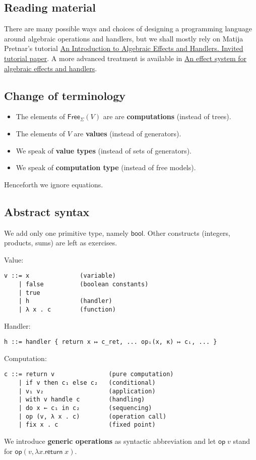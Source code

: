 \documentclass{article}
\begin{document}
\subsection{Reading material}

There are many possible ways and choices of designing a programming language
around algebraic operations and handlers, but we shall mostly rely on Matija
Pretnar's tutorial \href{http://www.eff-lang.org/handlers-tutorial.pdf}{An
  Introduction to Algebraic Effects and Handlers. Invited tutorial paper}. A
more advanced treatment is available in
\href{https://arxiv.org/abs/1306.6316}{An effect system for algebraic effects
  and handlers}.

\subsection{Change of terminology}

\begin{itemize}
\item The elements of $\mathsf{Free}_\Sigma(V)$ are  are \textbf{computations} (instead of trees).
\item The elements of $V$ are \textbf{values} (instead of generators).
\item We speak of \textbf{value types} (instead of sets of generators).
\item We speak of \textbf{computation type} (instead of free models).
\end{itemize}

Henceforth we ignore equations.

\subsection{Abstract syntax}

We add only one primitive type, namely $\mathsf{bool}$. Other constructs
(integers, products, sums) are left as exercises.

\noindent
Value:
%
\begin{lstlisting}
v ::= x              (variable)
    | false          (boolean constants)
    | true
    | h              (handler)
    | λ x . c        (function)
\end{lstlisting}
%
Handler:
%
\begin{lstlisting}
h ::= handler { return x ↦ c_ret, ... opᵢ(x, κ) ↦ cᵢ, ... }
\end{lstlisting}
%
Computation:
%
\begin{lstlisting}
c ::= return v               (pure computation)
    | if v then c₁ else c₂   (conditional)
    | v₁ v₂                  (application)
    | with v handle c        (handling)
    | do x ← c₁ in c₂        (sequencing)
    | op (v, λ x . c)        (operation call)
    | fix x . c              (fixed point)
\end{lstlisting}
%
We introduce \textbf{generic operations} as syntactic abbreviation and let
$\mathsf{op}\;v$ stand for $\mathsf{op}(v, \lambda x . \mathsf{return}\; x)$.
\end{document}
